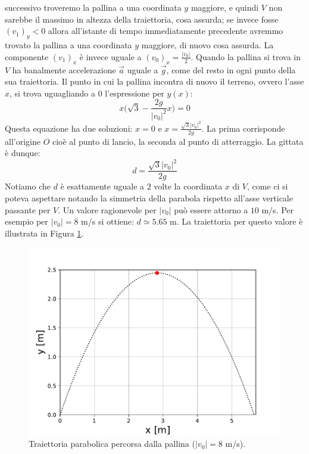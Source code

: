 \documentclass[12pt,a4paper]{book}
\begin{document}
successivo troveremo la pallina a una coordinata $y$ maggiore, e quindi $V$ non sarebbe il massimo in altezza della traiettoria, cosa assurda; se invece fosse $(v_1)_y<0$ allora all'istante di tempo immediatamente precedente avremmo trovato la pallina a una coordinata $y$ maggiore, di nuovo cosa assurda. La componente $(v_1)_x$ è invece uguale a $(v_0)_x=\frac{|v_0|}{2}$. Quando la pallina si trova in $V$ ha banalmente accelerazione $\vec{a}$ uguale a $\vec{g}$, come del resto in ogni punto della sua traiettoria. Il punto in cui la pallina incontra di nuovo il terreno, 
ovvero l'asse $x$, si trova uguagliando a $0$ l'espressione per
$y(x)$: 
%
\begin{equation*}
x \big(\sqrt{3}  - \frac{2 g}{|v_0|^2} x\big) =0
\end{equation*}
%
Questa equazione ha due soluzioni: $x=0$ e $x=\frac{\sqrt{3}|v_0|^2}{2g}$. La prima corrisponde all'origine $O$ cioè al punto di lancio, la seconda al punto di atterraggio. La gittata è dunque:
%
\begin{equation*}
d=\frac{\sqrt{3}|v_0|^2}{2g}
\end{equation*}
%
Notiamo che $d$ è esattamente uguale a $2$ volte la coordinata $x$ di $V$, come ci si poteva aspettare notando la simmetria della parabola rispetto all'asse verticale passante per $V$. 
Un valore ragionevole per $|v_0|$ può essere attorno a $10$ m/s. Per esempio per $|v_0|=8$ m/s si ottiene: $d\simeq 5.65$ m.
La traiettoria per questo valore è illustrata in Figura \ref{fig:traiettoria}.

 \begin{figure}[!ht]
 \centering
\includegraphics[scale=0.55]{traiettoria.pdf}
\caption{Traiettoria parabolica
percorsa dalla pallina ($|v_0|=8$ m/s).\label{fig:traiettoria} }
\end{figure}
\end{document}
